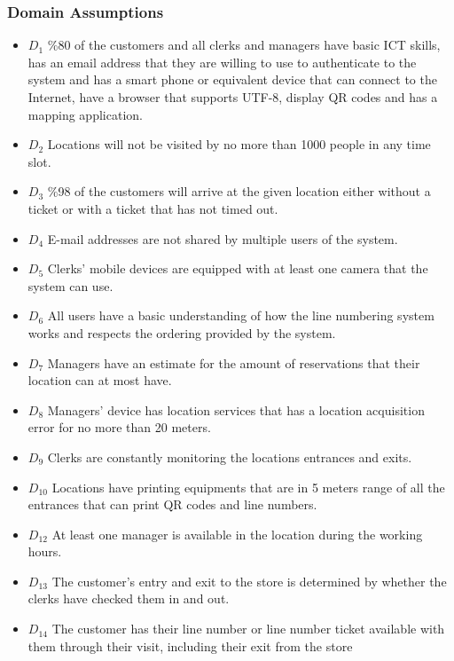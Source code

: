 \subsubsection{Domain Assumptions}

\begin{itemize}
    \item \textbf{$D_1$} \%80 of the customers and all clerks and managers have basic ICT skills, has an email address that they are willing to use to authenticate to the system and has a smart phone or equivalent device that can connect to the Internet, have a browser that supports UTF-8, display QR codes and has a mapping application. %
    \item \textbf{$D_2$} Locations will not be visited by no more than 1000 people in any time slot. %
    \item \textbf{$D_3$} \%98 of the customers will arrive at the given location either without a ticket or with a ticket that has not timed out. %
    \item \textbf{$D_4$} E-mail addresses are not shared by multiple users of the system. %
    \item \textbf{$D_5$} Clerks' mobile devices are equipped with at least one camera that the system can use. %
    \item \textbf{$D_6$} All users have a basic understanding of how the line numbering system works and respects the ordering provided by the system. %
    \item \textbf{$D_7$} Managers have an estimate for the amount of reservations that their location can at most have. %
    \item \textbf{$D_8$} Managers' device has location services that has a location acquisition error for no more than 20 meters. %
    \item \textbf{$D_9$} Clerks are constantly monitoring the locations entrances and exits. %
    \item \textbf{$D_{10}$} Locations have printing equipments that are in 5 meters range of all the entrances that can print QR codes and line numbers. %
    \item \textbf{$D_{12}$} At least one manager is available in the location during the working hours. %
    \item \textbf{$D_{13}$} The customer's entry and exit to the store is determined by whether the clerks have checked them in and out.
    \item \textbf{$D_{14}$} The customer has their line number or line number ticket available with them through their visit, including their exit from the store %
\end{itemize}
